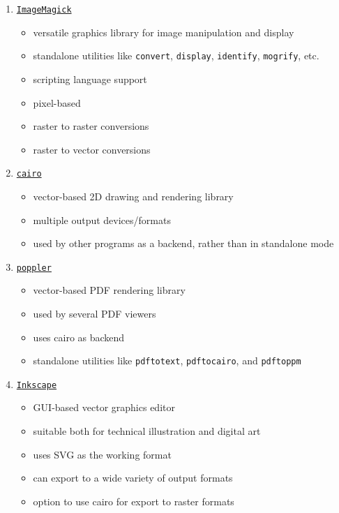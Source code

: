 \documentclass[
  a4paper,
]{article}
\providecommand{\tightlist}{%
  \setlength{\itemsep}{0pt}\setlength{\parskip}{0pt}}
\begin{document}
\begin{enumerate}
\tightlist
\item
  \href{https://imagemagick.org/index.php}{\texttt{ImageMagick}}

  \begin{itemize}
  \tightlist
  \item
    versatile graphics library for image manipulation and display
  \item
    standalone utilities like \texttt{convert}, \texttt{display},
    \texttt{identify}, \texttt{mogrify}, etc.
  \item
    scripting language support
  \item
    pixel-based
  \item
    raster to raster conversions
  \item
    raster to vector conversions
  \end{itemize}
\item
  \href{https://www.cairographics.org/}{\texttt{cairo}}

  \begin{itemize}
  \tightlist
  \item
    vector-based 2D drawing and rendering library
  \item
    multiple output devices/formats
  \item
    used by other programs as a backend, rather than in standalone mode
  \end{itemize}
\item
  \href{https://poppler.freedesktop.org/}{\texttt{poppler}}

  \begin{itemize}
  \tightlist
  \item
    vector-based PDF rendering library
  \item
    used by several PDF viewers
  \item
    uses cairo as backend
  \item
    standalone utilities like \texttt{pdftotext}, \texttt{pdftocairo},
    and \texttt{pdftoppm}
  \end{itemize}
\item
  \href{https://inkscape.org/}{\texttt{Inkscape}}

  \begin{itemize}
  \tightlist
  \item
    GUI-based vector graphics editor
  \item
    suitable both for technical illustration and digital art
  \item
    uses SVG as the working format
  \item
    can export to a wide variety of output formats
  \item
    option to use cairo for export to raster formats
  \end{itemize}
\end{enumerate}
\end{document}

